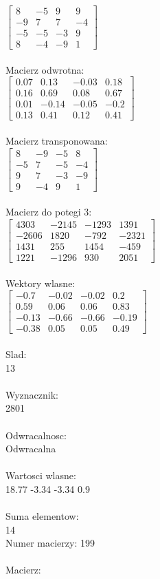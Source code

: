 \documentclass[a4paper,12pt]{article}
\begin{document}
$\begin{bmatrix} 8&-5&9&9\\-9&7&7&-4\\-5&-5&-3&9\\8&-4&-9&1 \end{bmatrix}$
\\
\\
Macierz odwrotna:\\

$\begin{bmatrix} 0.07&0.13&-0.03&0.18\\0.16&0.69&0.08&0.67\\0.01&-0.14&-0.05&-0.2\\0.13&0.41&0.12&0.41 \end{bmatrix}$
\\
\\
Macierz transponowana:\\

$\begin{bmatrix} 8&-9&-5&8\\-5&7&-5&-4\\9&7&-3&-9\\9&-4&9&1 \end{bmatrix}$
\\
\\
Macierz do potegi 3:\\

$\begin{bmatrix} 4303&-2145&-1293&1391\\-2606&1820&-792&-2321\\1431&255&1454&-459\\1221&-1296&930&2051 \end{bmatrix}$
\\
\\
Wektory wlasne:\\

$\begin{bmatrix} -0.7&-0.02&-0.02&0.2\\0.59&0.06&0.06&0.83\\-0.13&-0.66&-0.66&-0.19\\-0.38&0.05&0.05&0.49 \end{bmatrix}$
\\
\\
Slad:\\
13
\\
\\
Wyznacznik:\\
2801
\\
\\
Odwracalnosc:\\
Odwracalna
\\
\\
Wartosci wlasne:\\
18.77 -3.34 -3.34 0.9
\\
\\
Suma elementow:\\
14
\\
\newpage
Numer macierzy:
199
\\
\\
Macierz:\\
\end{document}
